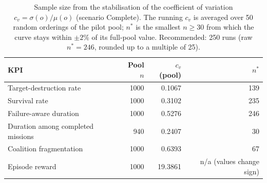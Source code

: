 \begin{table}[htbp]
  \centering
  \caption{Sample size from the stabilisation of the coefficient of variation $c_v=\sigma(o)/\mu(o)$ (scenario Complete). The running $c_v$ is averaged over 50 random orderings of the pilot pool; $n^*$ is the smallest $n \geq 30$ from which the curve stays within $\pm2\%$ of its full-pool value. Recommended: 250 runs (raw $n^*=246$, rounded up to a multiple of 25).}
  \label{tab:cv_stabilisation_Complete}
  \begin{tabular}{lrrr}
    \toprule
    KPI & Pool $n$ & $c_v$ (pool) & $n^*$ \\
    \midrule
    Target-destruction rate & 1000 & 0.1067 & 139 \\
    Survival rate & 1000 & 0.3102 & 235 \\
    Failure-aware duration & 1000 & 0.5276 & 246 \\
    Duration among completed missions & 940 & 0.2407 & 30 \\
    Coalition fragmentation & 1000 & 0.6393 & 67 \\
    Episode reward & 1000 & 19.3861 & n/a (values change sign) \\
    \bottomrule
  \end{tabular}
\end{table}
